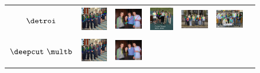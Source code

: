 \begin{figure}
  \begin{tabular}{c c c c c c c}
    \begin{sideways}\bf \small\quad\quad $\detroi$\end{sideways}&
    \includegraphics[height=0.145\linewidth]{imgidx_0114_sticks_unary_waf.pdf}&
    \includegraphics[height=0.145\linewidth]{imgidx_0050_sticks_unary_waf.pdf}& 
    \includegraphics[height=0.145\linewidth]{imgidx_0079_sticks_unary_waf.pdf}& %
    \includegraphics[height=0.145\linewidth]{imgidx_0007_sticks_unary_waf.pdf}& %
    \includegraphics[height=0.145\linewidth]{imgidx_0124_sticks_unary_waf.pdf}\\
    \begin{sideways}\bf \small\quad $\deepcut~\multb$\end{sideways}&
    \includegraphics[height=0.145\linewidth]{imgidx_0114_sticks_waf.pdf}&
    \includegraphics[height=0.145\linewidth]{imgidx_0050_sticks_waf.pdf}&

\end{tabular}
\end{figure}
